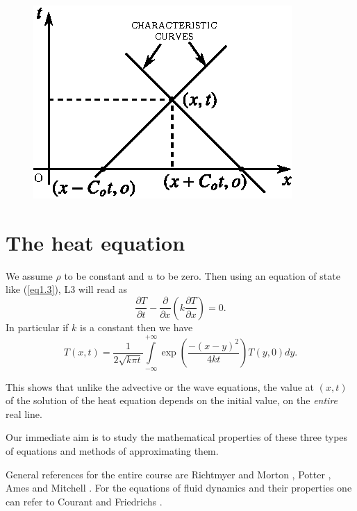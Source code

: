 \begin{figure}[H]
\centering
\includegraphics{figures/fig52-1.2.eps}
\caption{}\label{c1:fig1.2}
\end{figure}\pageoriginale

\section{The heat equation}\label{chap1:sec1.8}

We assume $\rho $ to be constant and $u$ to be zero. Then using an
equation of state like (\ref{eq1.3}), L3 will read as 
\begin{equation*}
\frac{\partial T}{\partial t} - \frac{\partial}{\partial x} \left(k
\frac{\partial T}{\partial x}\right) = 0. 
\tag{1.24}\label{eq1.24}
\end{equation*}
In particular if $k$ is a constant then we have
$$
T(x,t) = \frac{1}{2\sqrt{k\pi t}} \int\limits^{+\infty}_{-\infty} \exp
\left(\frac{-(x-y)^2}{4kt}\right)  T(y,0) dy.
$$ 

This shows that unlike the advective or the wave equations, the value
at $(x,t)$ of the solution of the heat equation depends on the initial
value, on the {\em entire} real line.

Our immediate aim is to study the mathematical properties of these
three types of equations and methods of approximating them.

\medskip
{}
General references for the entire course are Richtmyer and Morton
\cite{key32}, Potter \cite{key30}, Ames \cite{key2} and Mitchell
\cite{key27}. For the equations of fluid dynamics and their properties
one can refer to Courant and Friedrichs \cite{key9}. 

